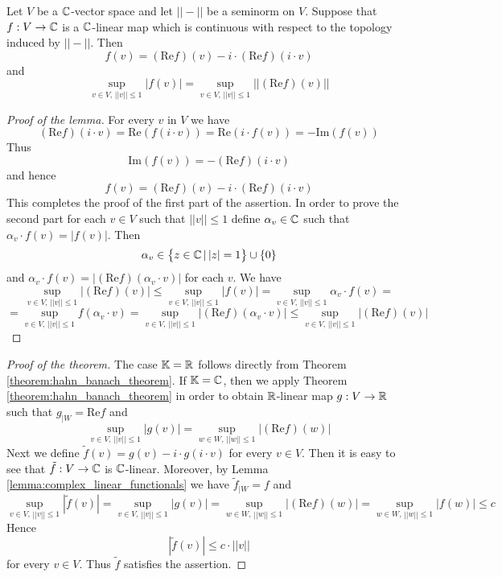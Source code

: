 \begin{lemma}\label{lemma:complex_linear_functionals}
Let $V$ be a ${\mathbb C}$-vector space and let $||-||$ be a seminorm on $V$. Suppose that $f:V\rightarrow {\mathbb C}$ is a ${\mathbb C}$-linear map which is continuous with respect to the topology induced by $||-||$. Then
$$f(v) = \left(\mathrm{Re}f\right)(v) - i \cdot \left(\mathrm{Re}f\right)(i\cdot v)$$
and
$$\sup_{v \in V,\,||v||\leq 1}|f(v)| = \sup_{v \in V,\,||v||\leq 1}||\left(\mathrm{Re}f\right)(v)||$$
\end{lemma}
\begin{proof}[Proof of the lemma]
For every $v$ in $V$ we have
$$\left(\mathrm{Re}f\right)(i\cdot v) = \mathrm{Re}\left(f(i\cdot v)\right) = \mathrm{Re}\left(i\cdot f(v)\right) = -\mathrm{Im}\left(f(v)\right)$$
Thus 
$$\mathrm{Im}\left(f(v)\right) = - \left(\mathrm{Re}f\right)(i\cdot v)$$
and hence
$$f(v) = \left(\mathrm{Re}f\right)(v) - i \cdot \left(\mathrm{Re}f\right)(i\cdot v)$$
This completes the proof of the first part of the assertion. In order to prove the second part for each $v \in V$ such that $||v|| \leq 1$ define $\alpha_v\in {\mathbb C}$ such that $\alpha_v \cdot f(v) = |f(v)|$. Then 
$$\alpha_v \in \big\{z\in {\mathbb C}\,|\,|z| = 1\big\}\cup \{0\}$$
and $\alpha_v \cdot f(v) = |\left(\mathrm{Re}f\right)\left(\alpha_v\cdot v\right)|$ for each $v$. We have
$$\sup_{v\in V,\,||v||\leq 1}\big|\left(\mathrm{Re}f\right)(v)\big| \leq \sup_{v\in V,\,||v|| \leq 1}\big|f(v)\big| = \sup_{v\in V,\,||v|| \leq 1}\alpha_v\cdot f(v) = $$
$$= \sup_{v\in V,\,||v|| \leq 1} f(\alpha_v\cdot v) = \sup_{v\in V,\,||v|| \leq 1} |\left(\mathrm{Re}f\right)(\alpha_v\cdot v)| \leq \sup_{v\in V,\,||v||\leq 1}\big|\left(\mathrm{Re}f\right)(v)\big|$$
\end{proof}

\begin{proof}[Proof of the theorem]
The case $\mathbb{K} = {\mathbb R}$ follows directly from Theorem \ref{theorem:hahn_banach_theorem}. If $\mathbb{K} = {\mathbb C}$, then we apply Theorem \ref{theorem:hahn_banach_theorem} in order to obtain ${\mathbb R}$-linear map $g:V\rightarrow {\mathbb R}$ such that $g_{\mid W} = \mathrm{Re}f$ and
$$\sup_{v\in V,\,||v||\leq 1}|g(v)| = \sup_{w\in W,\,||w||\leq 1}|\left(\mathrm{Re}f\right)(w)|$$
Next we define $\tilde{f}(v) = g(v) - i\cdot g(i\cdot v)$ for every $v\in V$. Then it is easy to see that $\tilde{f}:V\rightarrow {\mathbb C}$ is ${\mathbb C}$-linear. Moreover, by Lemma \ref{lemma:complex_linear_functionals} we have $\tilde{f}_{\mid W} = f$ and
$$\sup_{v\in V,\,||v||\leq 1}|\tilde{f}(v)| = \sup_{v\in V,\,||v||\leq 1}|g(v)| = \sup_{w\in W,\,||w||\leq 1}|\left(\mathrm{Re}f\right)(w)| = \sup_{w\in W,\,||w||\leq 1}|f(w)|\leq c$$
Hence
$$|\tilde{f}(v)| \leq c \cdot ||v||$$
for every $v\in V$. Thus $\tilde{f}$ satisfies the assertion.    
\end{proof}

